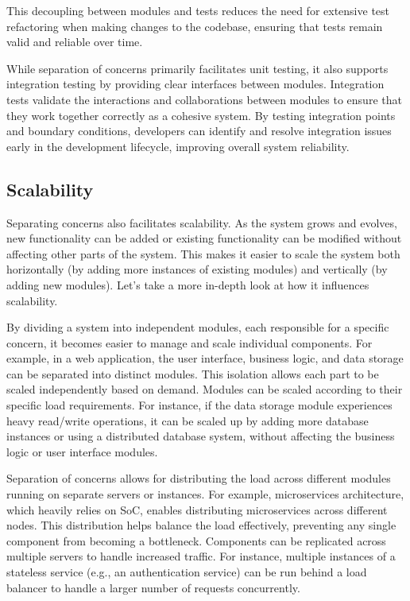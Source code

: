 This decoupling between modules and tests reduces the need for extensive test refactoring when making changes to the codebase, ensuring that tests remain valid and reliable over time.
 \par
While separation of concerns primarily facilitates unit testing, it also supports integration testing by providing clear interfaces between modules.
Integration tests validate the interactions and collaborations between modules to ensure that they work together correctly as a cohesive system.
By testing integration points and boundary conditions, developers can identify and resolve integration issues early in the development lifecycle, improving overall system reliability.


\subsection{Scalability}
Separating concerns also facilitates scalability.
As the system grows and evolves, new functionality can be added or existing functionality can be modified without affecting other parts of the system.
This makes it easier to scale the system both horizontally (by adding more instances of existing modules) and vertically (by adding new modules).
Let's take a more in-depth look at how it influences scalability.
\par
By dividing a system into independent modules, each responsible for a specific concern, it becomes easier to manage and scale individual components.
For example, in a web application, the user interface, business logic, and data storage can be separated into distinct modules.
This isolation allows each part to be scaled independently based on demand.
Modules can be scaled according to their specific load requirements.
For instance, if the data storage module experiences heavy read/write operations, it can be scaled up by adding more database instances or using a distributed database system, without affecting the business logic or user interface modules.
\par
Separation of concerns allows for distributing the load across different modules running on separate servers or instances.
For example, microservices architecture, which heavily relies on SoC, enables distributing microservices across different nodes.
This distribution helps balance the load effectively, preventing any single component from becoming a bottleneck.
Components can be replicated across multiple servers to handle increased traffic.
For instance, multiple instances of a stateless service (e.g., an authentication service) can be run behind a load balancer to handle a larger number of requests concurrently.
